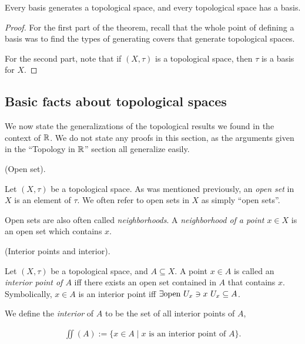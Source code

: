 \begin{theorem}
    Every basis generates a topological space, and every topological space has a basis.
\end{theorem}

\begin{proof}
    For the first part of the theorem, recall that the whole point of defining a basis was to find the types of generating covers that generate topological spaces.
    
    For the second part, note that if $(X, \tau)$ is a topological space, then $\tau$ is a basis for $X$.
\end{proof}

\subsection*{Basic facts about topological spaces}

We now state the generalizations of the topological results we found in the context of $\mathbb{R}$. We do not state any proofs in this section, as the arguments given in the ``Topology in $\mathbb{R}$'' section all generalize easily.

\begin{defn}
    (Open set).
    
    Let $(X, \tau)$ be a topological space. As was mentioned previously, an \textit{open set} in $X$ is an element of $\tau$. We often refer to open sets in $X$ as simply ``open sets''.
    
    Open sets are also often called \textit{neighborhoods}. A \textit{neighborhood of a point $x \in X$} is an open set which contains $x$.
\end{defn}

\begin{defn}
    (Interior points and interior).
    
    Let $(X, \tau)$ be a topological space, and  $A \subseteq X$. A point $x \in A$ is called an \textit{interior point of $A$} iff there exists an open set contained in $A$ that contains $x$. Symbolically, $x \in A$ is an interior point iff ${\exists \text{open } U_x \ni x \text{ } U_x \subseteq A}$. 
    
    We define the \textit{interior} of $A$ to be the set of all interior points of $A$,
    
    \begin{align*}
        \iint(A) := \{ x \in A \mid \text{$x$ is an interior point of $A$} \}.
    \end{align*}
\end{defn}

